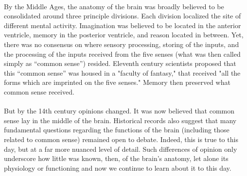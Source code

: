 \documentclass[12pt,a4paper]{article}
\begin{document}
\paragraph{}
By the Middle Ages, the anatomy of the brain was broadly believed to be consolidated around three principle divisions.  Each division localized the site of different mental activity.  Imagination was believed to be located in the anterior ventricle, memory in the posterior ventricle, and reason located in between.  Yet, there was no consensus on where sensory processing, storing of the inputs, and the processing of the inputs received from the five senses (what was then called simply as “common sense”) resided.  Eleventh century scientists proposed that this “common sense” was housed in a "faculty of fantasy," that received "all the forms which are imprinted on the five senses."  Memory then preserved what common sense received.
\paragraph{}
But by the 14th century opinions changed. It was now believed that common sense lay in the middle of the brain.  Historical records also suggest that many fundamental questions regarding the functions of the brain (including those related to common sense) remained open to debate.  Indeed, this is true to this day, but at a far more nuanced level of detail. Such differences of opinion only underscore how little was known, then, of the brain's anatomy, let alone its physiology or functioning and now we continue to learn about it to this day.
\end{document}
